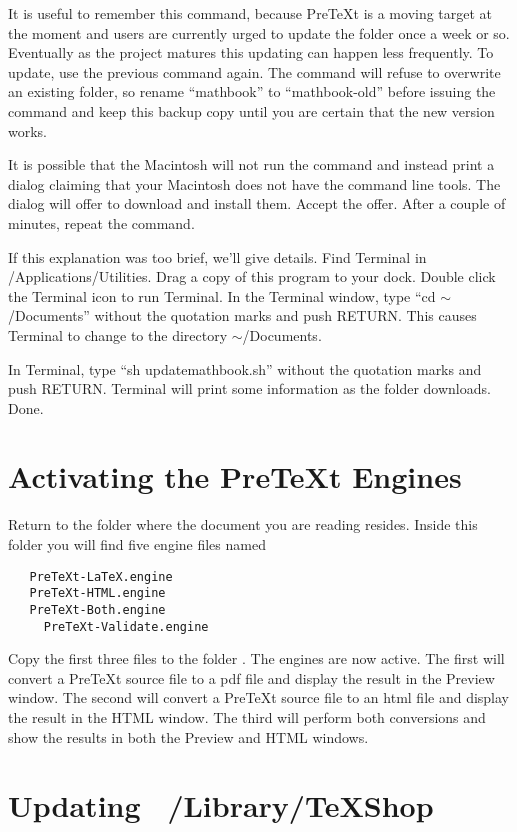 \documentclass[11pt, oneside]{article}   	%
\begin{document}
\newpage
It is useful to remember this command, because PreTeXt is a moving target at the moment and users are currently urged to update the folder once a week or so. Eventually as the project matures this updating can happen less frequently. To update, use the previous command again. The command  will refuse to overwrite an existing folder, so rename ``mathbook'' to ``mathbook-old'' before issuing the command and keep this backup copy until you are certain that the new version works.

It is possible that the Macintosh will not run the command and instead print a dialog claiming that your Macintosh does not have the command line tools. The dialog will offer to download and install them. Accept the offer. After a couple of minutes, repeat the command.

If this explanation was too brief, we'll give details.
Find Terminal in /Applications/Utilities. Drag a copy of this program to your dock. Double click the Terminal  icon to run Terminal.   In the Terminal window, type  ``cd $\sim$/Documents'' without the quotation marks and push RETURN. This causes Terminal to change to the directory $\sim$/Documents.

In Terminal, type ``sh updatemathbook.sh'' without the quotation marks and push RETURN. Terminal will print some information as the folder downloads. Done.

\section{Activating the PreTeXt Engines}

Return to the folder  where the document you are reading resides. Inside this folder you will find five engine files named 
\begin{verbatim}
   PreTeXt-LaTeX.engine
   PreTeXt-HTML.engine
   PreTeXt-Both.engine
     PreTeXt-Validate.engine
\end{verbatim}
Copy the first three files to the folder . The engines are now active. The first will convert a PreTeXt source file to a pdf file and display the result in the Preview window. The second will convert a PreTeXt source file to an html file and display the result in the HTML window. The third will perform both conversions and show the results in both the Preview and HTML windows. 
 
 \section{Updating ~/Library/TeXShop}
 
\end{document}
